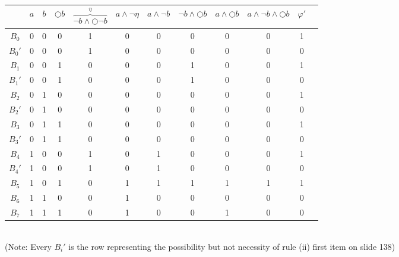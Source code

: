 \documentclass[11pt]{article}
\begin{document}
	\begin{tabular}{c|ccccccccccc}
		& $a$ & $b$ & $\bigcirc b$ & $ \overbrace{\lnot b\land\bigcirc\lnot b}^\eta$ & $a \land \lnot\eta$ & $a \land \lnot b$ & $\lnot b \land \bigcirc b$ & $a \land \bigcirc b$ &  $a\land\lnot b \land\bigcirc b$ & $\varphi'$\\ \hline
		$B_0$ & 0 & 0 & 0 & 1 & 0 & 0 & 0 & 0 & 0 & 1\\
		$B_0'$& 0 & 0 & 0 & 1 & 0 & 0 & 0 & 0 & 0 & 0\\
		$B_1$ & 0 & 0 & 1 & 0 & 0 & 0 & 1 & 0 & 0 & 1\\
		$B_1'$& 0 & 0 & 1 & 0 & 0 & 0 & 1 & 0 & 0 & 0\\
		$B_2$ & 0 & 1 & 0 & 0 & 0 & 0 & 0 & 0 & 0 & 1\\
		$B_2'$& 0 & 1 & 0 & 0 & 0 & 0 & 0 & 0 & 0 & 0\\
		$B_3$ & 0 & 1 & 1 & 0 & 0 & 0 & 0 & 0 & 0 & 1\\ 
		$B_3'$& 0 & 1 & 1 & 0 & 0 & 0 & 0 & 0 & 0 & 0\\ 
		$B_4$ & 1 & 0 & 0 & 1 & 0 & 1 & 0 & 0 & 0 & 1\\
		$B_4'$& 1 & 0 & 0 & 1 & 0 & 1 & 0 & 0 & 0 & 0\\
		$B_5$ & 1 & 0 & 1 & 0 & 1 & 1 & 1 & 1 & 1 & 1\\
		$B_6$ & 1 & 1 & 0 & 0 & 1 & 0 & 0 & 0 & 0 & 0\\
		$B_7$ & 1 & 1 & 1 & 0 & 1 & 0 & 0 & 1 & 0 & 0\\
	\end{tabular}\\
	{\footnotesize(Note: Every $B_i'$ is the row representing the possibility but not necessity of rule (ii) first item on slide 138)}
	
\end{document}
